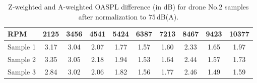 \begin{table}[!ht]
\caption{Z-weighted and A-weighted OASPL difference (in dB) for drone No.2 samples after normalization to $75\,$dB(A).}
\vskip3pt
\setlength{\tabcolsep}{6pt}
\begin{tabular}{l|ccccccccc}
\hline\hline
RPM & 2125 & 3456 & 4541 & 5424 & 6387 & 7213 & 8467 & 9423 & 10377 \\
\hline
Sample 1 & 3.17 & 3.04 & 2.07 & 1.77 & 1.57 & 1.60 & 2.33 & 1.65 & 1.97 \\
Sample 2 & 3.35 & 3.05 & 2.18 & 1.94 & 1.53 & 1.64 & 2.44 & 1.57 & 1.73 \\
Sample 3 & 2.84 & 3.02 & 2.06 & 1.82 & 1.56 & 1.77 & 2.46 & 1.49 & 1.59 \\
\hline\hline
\end{tabular}
\label{drone2az}
\end{table}
